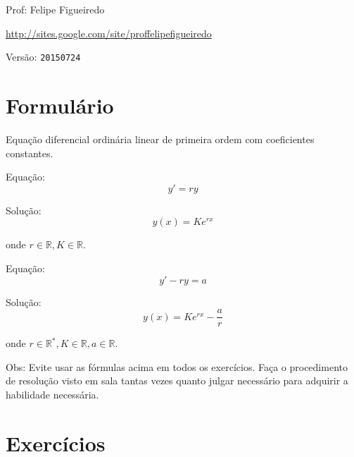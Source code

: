 \documentclass[a4paper]{article}
\begin{document}
\parbox[c]{.825\textwidth}{\raggedright%
{Prof: Felipe Figueiredo\par}
{\url{http://sites.google.com/site/proffelipefigueiredo}\par}
}

Versão: \verb|20150724|




\section{Formulário}

Equação diferencial ordinária linear de primeira ordem com
coeficientes constantes.

\bigskip
Equação:
\begin{displaymath}
  y' = ry
\end{displaymath}

Solução:
\begin{displaymath}
  y(x) = K e^{rx}
\end{displaymath}

onde $r \in \mathbb{R}, K \in \mathbb{R}$.

\bigskip

Equação:
\begin{displaymath}
  y' -ry = a
\end{displaymath}

Solução:
\begin{displaymath}
  y(x) = K e^{rx} - \frac{a}{r}
\end{displaymath}

onde $r \in \mathbb{R}^*, K \in \mathbb{R}, a \in \mathbb{R}$.

\bigskip
Obs: Evite usar as fórmulas acima em todos os exercícios. Faça o
procedimento de resolução visto em sala tantas vezes quanto julgar
necessário para adquirir a habilidade necessária.

\section{Exercícios}
\end{document}
